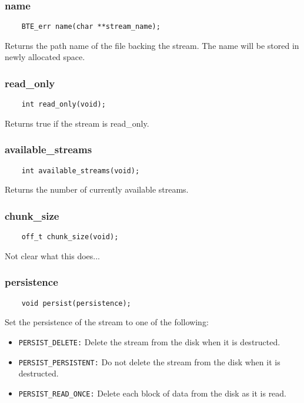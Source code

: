 \subsubsection{name}
\begin{verbatim}
    BTE_err name(char **stream_name);
\end{verbatim}
Returns the path name of the file backing the stream. The name will be
stored in newly allocated space.


\subsubsection{read\_only}
\begin{verbatim}
    int read_only(void);
\end{verbatim}
Returns true if the stream is read\_only.

    
\subsubsection{available\_streams}
\begin{verbatim}
    int available_streams(void);    
\end{verbatim}
Returns the number of currently available streams.

\subsubsection{chunk\_size}
\begin{verbatim}
    off_t chunk_size(void);
\end{verbatim}
Not clear what this does...


\subsubsection{persistence}
\begin{verbatim}
    void persist(persistence);
\end{verbatim}
Set the persistence of the stream to one of the following:
\begin{itemize}
\item \verb|PERSIST_DELETE:| Delete the stream from the disk when it is
  destructed.
\item \verb|PERSIST_PERSISTENT:| Do not delete the stream from the disk when
  it is destructed.
\item \verb|PERSIST_READ_ONCE:| Delete each block of data from the disk as
  it is read.
\end{itemize}

